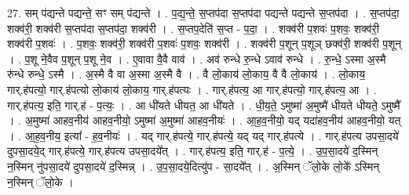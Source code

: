\documentclass[17pt]{extarticle}
\begin{document}
27. सम् प॑द्यन्ते पद्यन्ते॒ सꣳ सम् प॑द्यन्ते । . प॒द्य॒न्ते॒ स॒प्तप॑दा स॒प्तप॑दा पद्यन्ते पद्यन्ते स॒प्तप॑दा । . स॒प्तप॑दा॒ शक्व॑री॒ शक्व॑री स॒प्तप॑दा स॒प्तप॑दा॒ शक्व॑री । . स॒प्तप॒देति॑ स॒प्त - प॒दा॒ । . शक्व॑री प॒शवः॑ प॒शवः॒ शक्व॑री॒ शक्व॑री प॒शवः॑ । . प॒शवः॒ शक्व॑री॒ शक्व॑री प॒शवः॑ प॒शवः॒ शक्व॑री । . शक्व॑री प॒शून् प॒शूञ् छक्व॑री॒ शक्व॑री प॒शून् । . प॒शू ने॒वैव प॒शून् प॒शू ने॒व । . ए॒वावा वै॒वै वाव॑ । . अव॑ रुन्धे रु॒न्धे ऽवाव॑ रुन्धे । . रु॒न्धे॒ ऽस्मा अ॒स्मै रु॑न्धे रुन्धे॒ ऽस्मै । . अ॒स्मै वै वा अ॒स्मा अ॒स्मै वै । . वै लो॒काय॑ लो॒काय॒ वै वै लो॒काय॑ । . लो॒काय॒ गार्.ह॑पत्यो॒ गार्.ह॑पत्यो लो॒काय॑ लो॒काय॒ गार्.ह॑पत्यः । . गार्.ह॑पत्य॒ आ गार्.ह॑पत्यो॒ गार्.ह॑पत्य॒ आ । . गार्.ह॑पत्य॒ इति॒ गार्.ह॑ - प॒त्यः॒ । . आ धी॑यते धीयत॒ आ धी॑यते । . धी॒य॒ते॒ ऽमुष्मा॑ अ॒मुष्मै॑ धीयते धीयते॒ ऽमुष्मै᳚ । . अ॒मुष्मा॑ आहव॒नीय॑ आहव॒नीयो॒ ऽमुष्मा॑ अ॒मुष्मा॑ आहव॒नीयः॑ । . आ॒ह॒व॒नीयो॒ यद् यदा॑हव॒नीय॑ आहव॒नीयो॒ यत् । . आ॒ह॒व॒नीय॒ इत्या᳚ - ह॒व॒नीयः॑ । . यद् गार्.ह॑पत्ये॒ गार्.ह॑पत्ये॒ यद् यद् गार्.ह॑पत्ये । . गार्.ह॑पत्य उपसा॒दये॑ दुपसा॒दये॒द् गार्.ह॑पत्ये॒ गार्.ह॑पत्य उपसा॒दये᳚त् । . गार्.ह॑पत्य॒ इति॒ गार्.ह॑ - प॒त्ये॒ । . उ॒प॒सा॒दये॑ द॒स्मिन् न॒स्मिन् नु॑पसा॒दये॑ दुपसा॒दये॑ द॒स्मिन्न् । . उ॒प॒सा॒दये॒दित्यु॑प - सा॒दये᳚त् । . अ॒स्मिन् ॅलो॒के लो॒के᳚ ऽस्मिन् न॒स्मिन् ॅलो॒के । \newline
\end{document}
